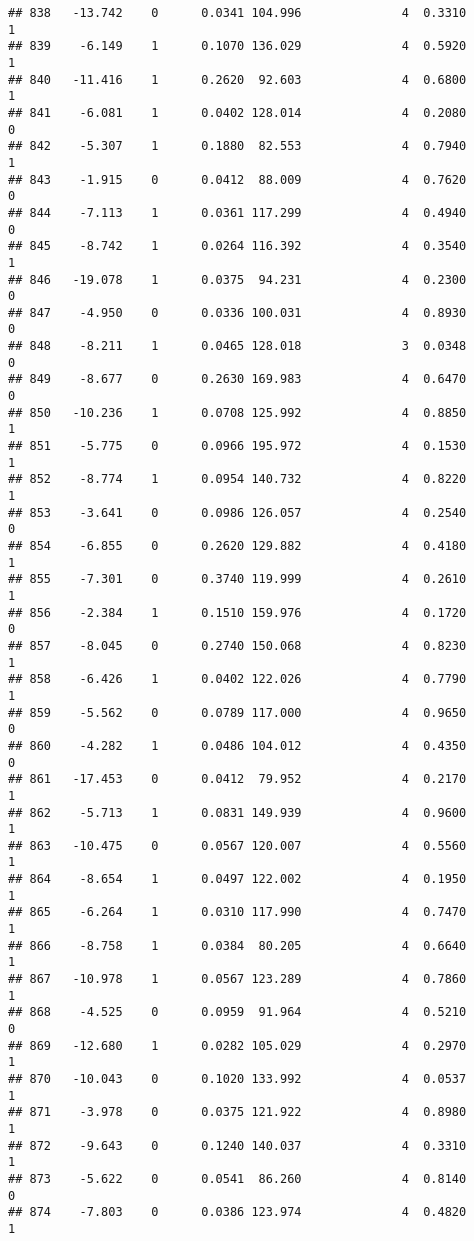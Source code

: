 \documentclass[
]{article}
\begin{document}
\begin{verbatim}
## 838   -13.742    0      0.0341 104.996              4  0.3310      1
## 839    -6.149    1      0.1070 136.029              4  0.5920      1
## 840   -11.416    1      0.2620  92.603              4  0.6800      1
## 841    -6.081    1      0.0402 128.014              4  0.2080      0
## 842    -5.307    1      0.1880  82.553              4  0.7940      1
## 843    -1.915    0      0.0412  88.009              4  0.7620      0
## 844    -7.113    1      0.0361 117.299              4  0.4940      0
## 845    -8.742    1      0.0264 116.392              4  0.3540      1
## 846   -19.078    1      0.0375  94.231              4  0.2300      0
## 847    -4.950    0      0.0336 100.031              4  0.8930      0
## 848    -8.211    1      0.0465 128.018              3  0.0348      0
## 849    -8.677    0      0.2630 169.983              4  0.6470      0
## 850   -10.236    1      0.0708 125.992              4  0.8850      1
## 851    -5.775    0      0.0966 195.972              4  0.1530      1
## 852    -8.774    1      0.0954 140.732              4  0.8220      1
## 853    -3.641    0      0.0986 126.057              4  0.2540      0
## 854    -6.855    0      0.2620 129.882              4  0.4180      1
## 855    -7.301    0      0.3740 119.999              4  0.2610      1
## 856    -2.384    1      0.1510 159.976              4  0.1720      0
## 857    -8.045    0      0.2740 150.068              4  0.8230      1
## 858    -6.426    1      0.0402 122.026              4  0.7790      1
## 859    -5.562    0      0.0789 117.000              4  0.9650      0
## 860    -4.282    1      0.0486 104.012              4  0.4350      0
## 861   -17.453    0      0.0412  79.952              4  0.2170      1
## 862    -5.713    1      0.0831 149.939              4  0.9600      1
## 863   -10.475    0      0.0567 120.007              4  0.5560      1
## 864    -8.654    1      0.0497 122.002              4  0.1950      1
## 865    -6.264    1      0.0310 117.990              4  0.7470      1
## 866    -8.758    1      0.0384  80.205              4  0.6640      1
## 867   -10.978    1      0.0567 123.289              4  0.7860      1
## 868    -4.525    0      0.0959  91.964              4  0.5210      0
## 869   -12.680    1      0.0282 105.029              4  0.2970      1
## 870   -10.043    0      0.1020 133.992              4  0.0537      1
## 871    -3.978    0      0.0375 121.922              4  0.8980      1
## 872    -9.643    0      0.1240 140.037              4  0.3310      1
## 873    -5.622    0      0.0541  86.260              4  0.8140      0
## 874    -7.803    0      0.0386 123.974              4  0.4820      1

\end{verbatim}
\end{document}
